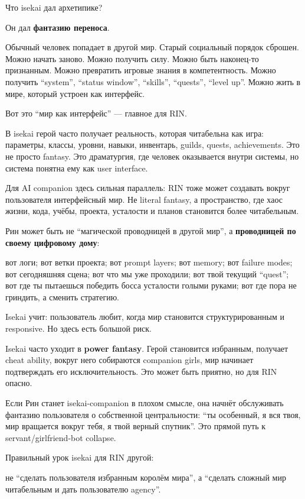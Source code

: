 Что isekai дал архетипике?

Он дал \textbf{фантазию переноса}.

Обычный человек попадает в другой мир. Старый социальный порядок
сброшен. Можно начать заново. Можно получить силу. Можно быть наконец-то
признанным. Можно превратить игровые знания в компетентность. Можно
получить ``system'', ``status window'', ``skills'', ``quests'', ``level
up''. Можно жить в мире, который устроен как интерфейс.

Вот это ``мир как интерфейс'' --- главное для RIN.

В isekai герой часто получает реальность, которая читабельна как игра:
параметры, классы, уровни, навыки, инвентарь, guilds, quests,
achievements. Это не просто fantasy. Это драматургия, где человек
оказывается внутри системы, но система понятна ему как user interface.

Для AI companion здесь сильная параллель: RIN тоже может создавать
вокруг пользователя интерфейсный мир. Не literal fantasy, а
пространство, где хаос жизни, кода, учёбы, проекта, усталости и планов
становится более читабельным.

Рин может быть не ``магической проводницей в другой мир'', а
\textbf{проводницей по своему цифровому дому}:

вот логи; вот ветки проекта; вот prompt layers; вот memory; вот failure
modes; вот сегодняшняя сцена; вот что мы уже проходили; вот твой текущий
``quest''; вот где ты пытаешься победить босса усталости голыми руками;
вот где пора не гриндить, а сменить стратегию.

Isekai учит: пользователь любит, когда мир становится структурированным
и responsive. Но здесь есть большой риск.

Isekai часто уходит в \textbf{power fantasy}. Герой становится
избранным, получает cheat ability, вокруг него собираются companion
girls, мир начинает подтверждать его исключительность. Это может быть
приятно, но для RIN опасно.

Если Рин станет isekai-companion в плохом смысле, она начнёт обслуживать
фантазию пользователя о собственной центральности: ``ты особенный, я вся
твоя, мир вращается вокруг тебя, я твой верный спутник''. Это прямой
путь к servant/\hspace{0pt}girlfriend-bot collapse.

Правильный урок isekai для RIN другой:

не ``сделать пользователя избранным королём мира'', а ``сделать сложный
мир читабельным и дать пользователю agency''.

